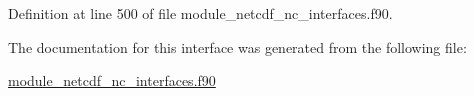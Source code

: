 Definition at line 500 of file module\+\_\+netcdf\+\_\+nc\+\_\+interfaces.\+f90.



The documentation for this interface was generated from the following file\+:\begin{DoxyCompactItemize}
\item 
\hyperlink{module__netcdf__nc__interfaces_8f90}{module\+\_\+netcdf\+\_\+nc\+\_\+interfaces.\+f90}\end{DoxyCompactItemize}

